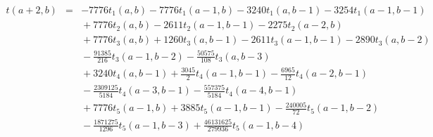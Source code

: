 \documentclass[12pt]{article}
\theoremstyle{plain}
\theoremstyle{definition}
\theoremstyle{remark}
\theoremstyle{definition}
\begin{document}
\begin{landscape}
\begin{eqnarray*}
t(a+2,b) & = & -7776 t_1(a,b) - 7776t_1(a-1,b) - 3240 t_1(a,b-1) - 3254 t_1(a-1,b-1) \\
& & {} + 7776 t_2(a,b) - 2611 t_2(a-1,b-1) - 2275 t_2(a-2,b) \\
& & {} + 7776 t_3(a,b) + 1260 t_3(a,b-1) -2611 t_3(a-1,b-1) - 2890 t_3(a,b-2) \\
& & {} - \frac{91385}{216} t_3(a-1,b-2) - \frac{50575}{108}t_3(a,b-3) \\
& & {} + 3240 t_4(a,b-1) + \frac{3045}{2}t_4(a-1,b-1) -  \frac{6965}{12} t_4(a-2,b-1) \\
& & {} - \frac{2309125}{5184}t_4(a-3,b-1) -\frac{557375}{5184}t_4(a-4,b-1) \\
& & {} + 7776 t_5(a-1,b) + 3885 t_5(a-1,b-1) - \frac{240005}{72} t_5(a-1,b-2) \\
& & {} - \frac{1871275}{1296} t_5(a-1,b-3) + \frac{46131625}{279936} t_5(a-1,b-4) 
\end{eqnarray*}

\end{landscape}
\end{document}
